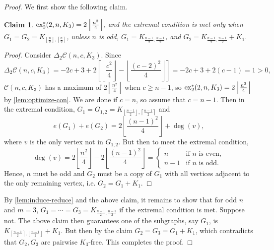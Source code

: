 \documentclass[12pt]{report}
\newtheorem{claim}{Claim}[theorem]
\newcommand*{\dex}{\textnormal{ex}_2}
\newcommand*{\con}{\mathcal{C}}
\begin{document}
\begin{proof}
  We first show the following claim.

  \begin{claim}\label{claim:induce-triangle}
    $\dex^*(2, n, K_3) = 2\left\lfloor\frac{n^2}{4}\right\rfloor$, and the extremal condition is met only when $G_1 = G_2 = K_{\left\lfloor\frac{n}{2}\right\rfloor, \left\lceil\frac{n}{2}\right\rceil}$, unless $n$ is odd, $G_1 = K_{\frac{n - 1}{2}, \frac{n - 1}{2}}$, and $G_2 = K_{\frac{n - 1}{2}, \frac{n - 1}{2}} + K_1$.
  \end{claim}

  \begin{proof}
    Consider $\Delta_2 \con(n, c, K_3)$. Since
    \[
      \Delta_2 \con(n, c, K_3) = -2c + 3 + 2\left[\left\lfloor\frac{c^2}{4}\right\rfloor - \left\lfloor\frac{(c - 2)^2}{4}\right\rfloor\right] = -2c + 3 + 2(c - 1) = 1 > 0,
    \]
    $\con(n, c, K_3)$ has a maximum of $2\left\lfloor \frac{n^2}{4} \right\rfloor$ when $c \geq n - 1$, so $\dex^*(2, n, K_3) = 2\left\lfloor\frac{n^2}{4}\right\rfloor$ by \cref{lem:optimize-con}. We are done if $c = n$, so assume that $c = n - 1$. Then in the extremal condition, $G_1 = G_{1, 2} = K_{\left\lfloor\frac{n - 1}{2}\right\rfloor, \left\lceil\frac{n - 1}{2}\right\rceil}$ and
    \[
      e(G_1) + e(G_2) = 2\left\lfloor\frac{(n - 1)^2}{4}\right\rfloor + \deg(v),
    \]
    where $v$ is the only vertex not in $G_{1, 2}$. But then to meet the extremal condition, 
    \[
      \deg(v) = 2\left\lfloor\frac{n^2}{4}\right\rfloor - 2\left\lfloor\frac{(n - 1)^2}{4}\right\rfloor = \begin{cases}
        n & \text{if $n$ is even}, \\
        n - 1 & \text{if $n$ is odd}.
      \end{cases}
    \]
    Hence, $n$ must be odd and $G_2$ must be a copy of $G_1$ with all vertices adjacent to the only remaining vertex, i.e. $G_2 = G_1 + K_1$.
  \end{proof}
  By \cref{lem:induce-reduce} and the above claim, it remains to show that for odd $n$ and $m = 3$, $G_1 = \cdots = G_3 = K_{\frac{n + 1}{2}, \frac{n - 1}{2}}$ if the extremal condition is met. Suppose not. The above claim then guarantees one of the subgraphs, say $G_1$, is $K_{\left\lceil\frac{n - 1}{2}\right\rceil, \left\lfloor\frac{n - 1}{2}\right\rfloor} + K_1$. But then by the claim $G_2 = G_3 = G_1 + K_1$, which contradicts that $G_2, G_3$ are pairwise $K_3$-free. This completes the proof.
\end{proof}
\end{document}
